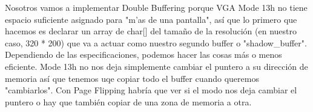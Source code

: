 \documentclass[]{article}
\begin{document}
Nosotros vamos a implementar Double Buffering porque VGA Mode 13h no tiene espacio suficiente asignado para "m'as de una pantalla", as\'i que lo primero que hacemos es declarar un array de char[] del tamaño de la resoluci\'on (en nuestro caso, 320 * 200) que va a actuar como nuestro segundo buffer o "shadow\_buffer".\\

Dependiendo de las especificaciones, podemos hacer las cosas m\'as o menos eficiente. Mode 13h no nos deja simplemente cambiar el puntero a su direcci\'on de memoria as\'i que tenemos uqe copiar todo el buffer cuando queremos "cambiarlos". Con Page Flipping habr\'ia que ver si el modo nos deja cambiar el puntero o hay que tambi\'en copiar de una zona de memoria a otra.
\end{document}
